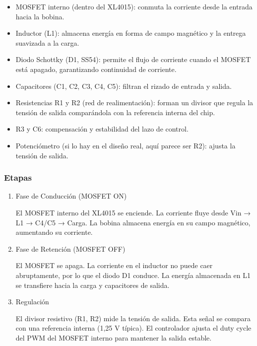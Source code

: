 \documentclass[12pt,a4paper]{article}
\begin{document}
\begin{itemize}

\item MOSFET interno (dentro del XL4015): conmuta la corriente desde la entrada hacia la bobina.

\item Inductor (L1): almacena energía en forma de campo magnético y la entrega suavizada a la carga.

\item Diodo Schottky (D1, SS54): permite el flujo de corriente cuando el MOSFET está apagado, garantizando continuidad de corriente.

\item Capacitores (C1, C2, C3, C4, C5): filtran el rizado de entrada y salida.

\item Resistencias R1 y R2 (red de realimentación): forman un divisor que regula la tensión de salida comparándola con la referencia interna del chip.

\item R3 y C6: compensación y estabilidad del lazo de control.

\item Potenciómetro (si lo hay en el diseño real, aquí parece ser R2): ajusta la tensión de salida.

\end{itemize}

\subsubsection{Etapas}

\begin{enumerate}
\item Fase de Conducción (MOSFET ON)

El MOSFET interno del XL4015 se enciende. La corriente fluye desde Vin → L1 → C4/C5 → Carga. La bobina almacena energía en su campo magnético, aumentando su corriente.

\item Fase de Retención (MOSFET OFF)

El MOSFET se apaga. La corriente en el inductor no puede caer abruptamente, por lo que el diodo D1 conduce. La energía almacenada en L1 se transfiere hacia la carga y capacitores de salida.

\item Regulación

El divisor resistivo (R1, R2) mide la tensión de salida. Esta señal se compara con una referencia interna (1,25 V típica). El controlador ajusta el duty cycle del PWM del MOSFET interno para mantener la salida estable.
\end{enumerate}
\end{document}

